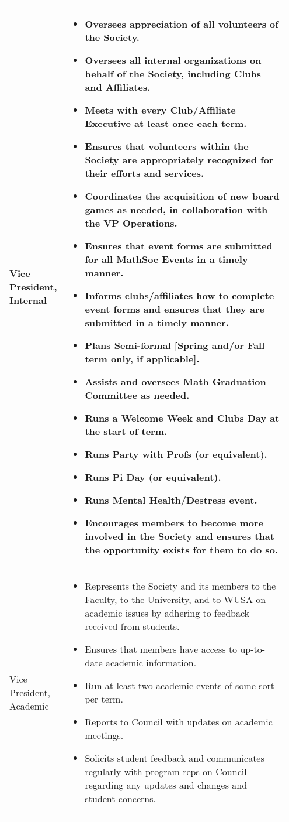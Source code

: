 \begin{longtable}{p{0.2\linewidth} p{0.75\linewidth}}
\midrule
Vice President, Internal &
\begin{itemize}
\item Oversees appreciation of all volunteers of the Society.
\item Oversees all internal organizations on behalf of the Society, including Clubs and Affiliates.
\item Meets with every Club/Affiliate Executive at least once each term.
\item Ensures that volunteers within the Society are appropriately recognized for their efforts and services.
\item Coordinates the acquisition of new board games as needed, in collaboration with the VP Operations.
\item Ensures that event forms are submitted for all MathSoc Events in a timely manner.
\item Informs clubs/affiliates how to complete event forms and ensures that they are submitted in a timely manner.
\item Plans Semi-formal [Spring and/or Fall term only, if applicable].
\item Assists and oversees Math Graduation Committee as needed.
\item Runs a Welcome Week and Clubs Day at the start of term.
\item Runs Party with Profs (or equivalent).
\item Runs Pi Day (or equivalent).
\item Runs Mental Health/Destress event.
\item Encourages members to become more involved in the Society and ensures that the opportunity exists for them to do so.
\end{itemize}
\\
\midrule
Vice President, Academic &
\begin{itemize}
\item Represents the Society and its members to the Faculty, to the University, and to WUSA on academic issues by adhering to feedback received from students.
\item Ensures that members have access to up-to-date academic information.
\item Run at least two academic events of some sort per term.
\item Reports to Council with updates on academic meetings.
\item Solicits student feedback and communicates regularly with program reps on Council regarding any updates and changes and student concerns.

\end{itemize}
\end{longtable}
